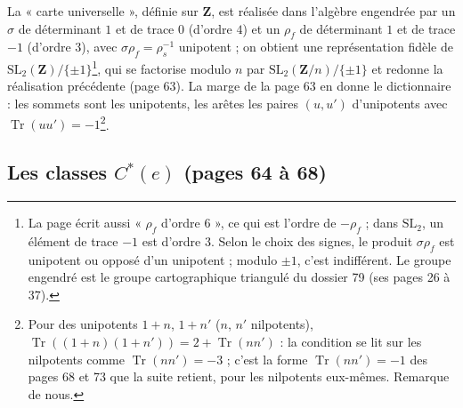 \documentclass[11pt,a4paper]{article}
\begin{document}
La « carte universelle », définie sur $\mathbf{Z}$, est réalisée dans l'algèbre
engendrée par un $\sigma$ de déterminant $1$ et de trace $0$ (d'ordre $4$) et un
$\rho_f$ de déterminant $1$ et de trace $-1$ (d'ordre $3$), avec $\sigma\rho_f
= \rho_s^{-1}$ unipotent ; on obtient une représentation fidèle de
$\mathrm{SL}_2(\mathbf{Z})/\{\pm 1\}$\footnote{La page écrit aussi « $\rho_f$
d'ordre $6$ », ce qui est l'ordre de $-\rho_f$ ; dans $\mathrm{SL}_2$, un
élément de trace $-1$ est d'ordre $3$. Selon le choix des signes, le produit
$\sigma\rho_f$ est unipotent ou opposé d'un unipotent ; modulo $\pm 1$, c'est
indifférent. Le groupe engendré est le groupe cartographique triangulé du
dossier 79 (ses pages 26 à 37).}, qui se factorise modulo $n$ par
$\mathrm{SL}_2(\mathbf{Z}/n)/\{\pm 1\}$ et redonne la réalisation précédente
(page 63). La marge de la page 63 en donne le dictionnaire : les sommets sont
les unipotents, les arêtes les paires $(u, u')$ d'unipotents avec
$\operatorname{Tr}(uu') = -1$\footnote{Pour des unipotents $1 + n$, $1 + n'$ ($n$,
$n'$ nilpotents), $\operatorname{Tr}((1+n)(1+n')) = 2 + \operatorname{Tr}(nn')$ :
la condition se lit sur les nilpotents comme $\operatorname{Tr}(nn') = -3$ ;
c'est la forme $\operatorname{Tr}(nn') = -1$ des pages 68 et 73 que la suite
retient, pour les nilpotents eux-mêmes. Remarque de nous.}.

\subsection*{Les classes $C^{*}(e)$ (pages 64 à 68)}
\end{document}

